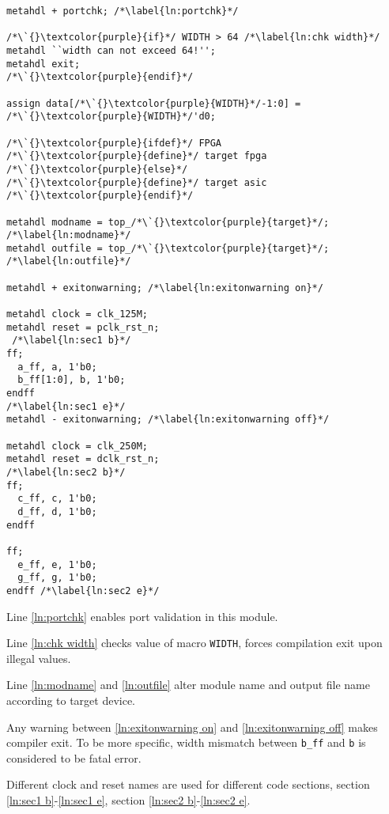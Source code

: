 \begin{minipage}[t]{.45\textwidth}
\begin{lstlisting}[caption={Demo Top Wrapper}, label={lst:top wrapper}]
metahdl + portchk; /*\label{ln:portchk}*/

/*\`{}\textcolor{purple}{if}*/ WIDTH > 64 /*\label{ln:chk width}*/
metahdl ``width can not exceed 64!'';
metahdl exit;
/*\`{}\textcolor{purple}{endif}*/

assign data[/*\`{}\textcolor{purple}{WIDTH}*/-1:0] = /*\`{}\textcolor{purple}{WIDTH}*/'d0;

/*\`{}\textcolor{purple}{ifdef}*/ FPGA
/*\`{}\textcolor{purple}{define}*/ target fpga
/*\`{}\textcolor{purple}{else}*/
/*\`{}\textcolor{purple}{define}*/ target asic
/*\`{}\textcolor{purple}{endif}*/

metahdl modname = top_/*\`{}\textcolor{purple}{target}*/; /*\label{ln:modname}*/
metahdl outfile = top_/*\`{}\textcolor{purple}{target}*/; /*\label{ln:outfile}*/

metahdl + exitonwarning; /*\label{ln:exitonwarning on}*/

metahdl clock = clk_125M; 
metahdl reset = pclk_rst_n; 
 /*\label{ln:sec1 b}*/
ff;
  a_ff, a, 1'b0; 
  b_ff[1:0], b, 1'b0;
endff
/*\label{ln:sec1 e}*/
metahdl - exitonwarning; /*\label{ln:exitonwarning off}*/

metahdl clock = clk_250M;
metahdl reset = dclk_rst_n;
/*\label{ln:sec2 b}*/
ff; 
  c_ff, c, 1'b0;
  d_ff, d, 1'b0;
endff

ff; 
  e_ff, e, 1'b0;
  g_ff, g, 1'b0;
endff /*\label{ln:sec2 e}*/
\end{lstlisting}
\end{minipage}
\begin{minipage}[t]{.5\textwidth}
\vspace{2ex}
Line \autoref{ln:portchk} enables port validation 
in this module. 

Line \autoref{ln:chk width} checks value of macro \texttt{WIDTH}, 
forces compilation exit upon illegal values. 

Line \autoref{ln:modname} and \autoref{ln:outfile} alter \sv{} module name and
output file name according to target device. 

Any warning between \autoref{ln:exitonwarning on} and \autoref{ln:exitonwarning off} makes 
compiler exit. To be more specific, width mismatch between \verb|b_ff| and \verb|b| is considered
to be fatal error. 

Different clock and reset names are used for different code sections, section \autoref{ln:sec1 b}-\autoref{ln:sec1 e}, 
section \autoref{ln:sec2 b}-\autoref{ln:sec2 e}.
\end{minipage}
